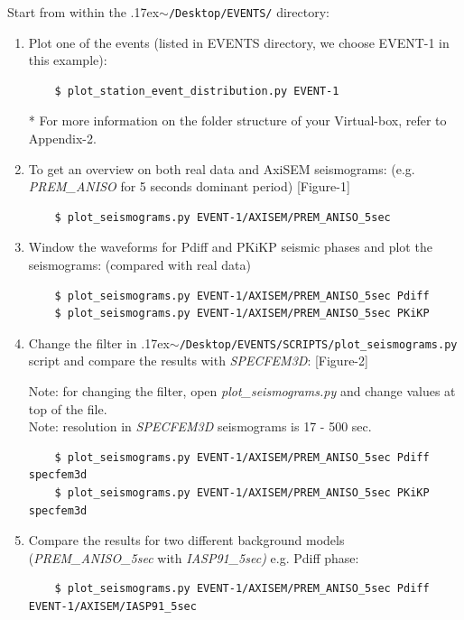 \documentclass{article}
\newcommand{\ttilde}[0]{\raise.17ex\hbox{$\scriptstyle\sim$}}
\begin{document}
Start from within the \ttilde\verb|/Desktop/EVENTS/| directory:

\begin{enumerate}
    
    \item Plot one of the events (listed in EVENTS directory, we choose EVENT-1 in this
    example):
    
    \begin{verbatim}
    $ plot_station_event_distribution.py EVENT-1
    \end{verbatim}
    * For more information on the folder structure of your Virtual-box, refer to
    Appendix-2.
    
    \item To get an overview on both real data and AxiSEM seismograms: 
    (e.g.  \textit{PREM\_ANISO} for 5 seconds dominant period) [Figure-1]
    \begin{verbatim}
    $ plot_seismograms.py EVENT-1/AXISEM/PREM_ANISO_5sec
    \end{verbatim}
    
    \item Window the waveforms for Pdiff and PKiKP seismic phases and plot the seismograms: 
    (compared with real data)
    \begin{verbatim}
    $ plot_seismograms.py EVENT-1/AXISEM/PREM_ANISO_5sec Pdiff
    $ plot_seismograms.py EVENT-1/AXISEM/PREM_ANISO_5sec PKiKP
    \end{verbatim}
    
    \item Change the filter in \ttilde\verb|/Desktop/EVENTS/SCRIPTS/plot_seismograms.py| script and compare the
    results with \textit{SPECFEM3D}: [Figure-2] 
    
    Note: for changing the filter, open \textit{plot\_seismograms.py} and change values at top of the file. \\
    Note: resolution in \textit{SPECFEM3D} seismograms is 17 - 500 sec.
    \begin{verbatim}
    $ plot_seismograms.py EVENT-1/AXISEM/PREM_ANISO_5sec Pdiff specfem3d
    $ plot_seismograms.py EVENT-1/AXISEM/PREM_ANISO_5sec PKiKP specfem3d
    \end{verbatim}
    
    \item Compare the results for two different background models
    (\textit{PREM\_ANISO\_5sec} with \textit{IASP91\_5sec)} e.g. Pdiff phase:
    
    \begin{verbatim}
    $ plot_seismograms.py EVENT-1/AXISEM/PREM_ANISO_5sec Pdiff EVENT-1/AXISEM/IASP91_5sec
    \end{verbatim}
    

\end{enumerate}
\end{document}
